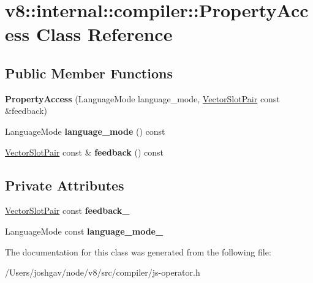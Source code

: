 \hypertarget{classv8_1_1internal_1_1compiler_1_1_property_access}{}\section{v8\+:\+:internal\+:\+:compiler\+:\+:Property\+Access Class Reference}
\label{classv8_1_1internal_1_1compiler_1_1_property_access}
\subsection*{Public Member Functions}
\begin{DoxyCompactItemize}
\item 
{\bfseries Property\+Access} (Language\+Mode language\+\_\+mode, \hyperlink{classv8_1_1internal_1_1compiler_1_1_vector_slot_pair}{Vector\+Slot\+Pair} const \&feedback)\hypertarget{classv8_1_1internal_1_1compiler_1_1_property_access_a52f983e8fb014ce74c8b97b474971a96}{}\label{classv8_1_1internal_1_1compiler_1_1_property_access_a52f983e8fb014ce74c8b97b474971a96}

\item 
Language\+Mode {\bfseries language\+\_\+mode} () const \hypertarget{classv8_1_1internal_1_1compiler_1_1_property_access_ae3b9a21e8cf3b073688a8224be927744}{}\label{classv8_1_1internal_1_1compiler_1_1_property_access_ae3b9a21e8cf3b073688a8224be927744}

\item 
\hyperlink{classv8_1_1internal_1_1compiler_1_1_vector_slot_pair}{Vector\+Slot\+Pair} const \& {\bfseries feedback} () const \hypertarget{classv8_1_1internal_1_1compiler_1_1_property_access_a1fa24813434708964b6f0406b5747d48}{}\label{classv8_1_1internal_1_1compiler_1_1_property_access_a1fa24813434708964b6f0406b5747d48}

\end{DoxyCompactItemize}
\subsection*{Private Attributes}
\begin{DoxyCompactItemize}
\item 
\hyperlink{classv8_1_1internal_1_1compiler_1_1_vector_slot_pair}{Vector\+Slot\+Pair} const {\bfseries feedback\+\_\+}\hypertarget{classv8_1_1internal_1_1compiler_1_1_property_access_af84ce4a2e8fc2ea5fc359459dddfbe28}{}\label{classv8_1_1internal_1_1compiler_1_1_property_access_af84ce4a2e8fc2ea5fc359459dddfbe28}

\item 
Language\+Mode const {\bfseries language\+\_\+mode\+\_\+}\hypertarget{classv8_1_1internal_1_1compiler_1_1_property_access_af282bd330ef05292a7046bc8744017dd}{}\label{classv8_1_1internal_1_1compiler_1_1_property_access_af282bd330ef05292a7046bc8744017dd}

\end{DoxyCompactItemize}


The documentation for this class was generated from the following file\+:\begin{DoxyCompactItemize}
\item 
/\+Users/joshgav/node/v8/src/compiler/js-\/operator.\+h\end{DoxyCompactItemize}
